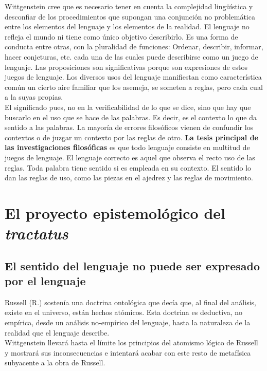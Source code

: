 \documentclass[a4paper, 11pt, twocolumn, spanish]{article}
\begin{document}
Wittgenstein cree que es necesario tener en cuenta la complejidad
lingüística y desconfiar de los procedimientos que supongan una
conjunción no problemática entre los elementos del lenguaje y los
elementos de la realidad. El lenguaje no refleja el mundo ni tiene
como único objetivo describirlo. Es una forma de conducta entre otras,
con la pluralidad de funciones: Ordenar, describir, informar, hacer
conjeturas, etc. cada una de las cuales puede describirse como un
juego de lenguaje. Las proposiciones son significativas porque son
expresiones de estos juegos de lenguaje. Los diversos usos del
lenguaje manifiestan como característica común un cierto aire familiar
que los asemeja, se someten a reglas, pero cada cual a la suyas
propias.\\

El significado pues, no en la verificabilidad de lo que se dice, sino
que hay que buscarlo en el uso que se hace de las palabras. Es decir,
es el contexto lo que da sentido a las palabras. La mayoría de errores
filosóficos vienen de confundir los contextos o de juzgar un contexto
por las reglas de otro. \textbf{La tesis principal de las investigaciones
filosóficas} es que todo lenguaje consiste en multitud de juegos de
lenguaje. El lenguaje correcto es aquel que observa el recto uso de
las reglas. Toda palabra tiene sentido si es empleada en su
contexto. El sentido lo dan las reglas de uso, como las piezas en el
ajedrez y las reglas de movimiento.

\section{El proyecto epistemológico del \emph{tractatus}}
\label{sec:orgb2488d8}
\subsection{El sentido del lenguaje no puede ser expresado por el lenguaje}
\label{sec:orgf6034b3}
Russell (R.) sostenía una doctrina ontológica que decía que, al final
del análisis, existe en el universo, están hechos atómicos. Esta
doctrina es deductiva, no empírica, desde un análisis no-empírico del
lenguaje, hasta la naturaleza de la realidad que el lenguaje
describe.\\
Wittgenstein llevará hasta el límite los principios del atomismo
lógico de Russell y mostrará sus inconsecuencias e intentará acabar
con este resto de metafísica subyacente a la obra de Russell.\\
\end{document}
